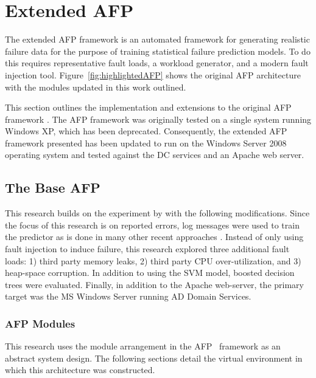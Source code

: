 \section{Extended \acrfull{AFP}} \label{chapter3}
The extended \ac{AFP} framework is an automated framework for generating
realistic failure data for the purpose of training statistical failure
prediction models.  To do this requires representative fault loads, a workload
generator, and a modern fault injection tool.  Figure~\ref{fig:highlightedAFP}
shows the original \ac{AFP} architecture with the modules updated in this work
outlined.

This section outlines the implementation and extensions to the original
\ac{AFP} framework \citep{irrera2015}.  The \ac{AFP} framework was originally
tested on a single system running Windows XP, which has been deprecated.
Consequently, the extended \ac{AFP} framework presented has been updated to run
on the Windows Server 2008 operating system and tested against the \ac{DC}
services and an Apache web server.

\subsection{The Base \acrfull{AFP}} \label{sec:implementation}
This research builds on the experiment by \citet{irrera2015} with the following
modifications.  Since the focus of this research is on reported errors, log
messages were used to train the predictor as is done in many other recent
approaches \citep{domeniconi2002,fulp2008,salfner2007,watanabe2014}.  Instead
of only using fault injection to induce failure, this research explored three
additional fault loads: 1) third party memory leaks, 2) third party \ac{CPU}
over-utilization, and 3) heap-space corruption.  In addition to using the
\ac{SVM} model, boosted decision trees were evaluated.  Finally, in addition to
the Apache web-server, the primary target was the \ac{MS} Windows Server
running \ac{AD} Domain Services.

\subsubsection{\acrfull{AFP} Modules}
This research uses the module arrangement in the \ac{AFP}~\citep{irrera2015}
framework as an abstract system design.  The following sections detail the
virtual environment in which this architecture was constructed.


